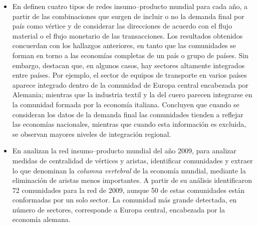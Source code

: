 \begin{itemize}
	\item En \textcite{Piccardi2018} definen cuatro tipos de redes insumo--producto mundial para cada año, a partir
    de las combinaciones que surgen de incluir o no la demanda final por país como vértice y de considerar las direcciones de acuerdo con el flujo material o el flujo monetario de las transacciones. Los resultados obtenidos concuerdan con los hallazgos anteriores, en tanto que las comunidades se forman en torno a las economías completas de un país o grupo de países. Sin embargo, destacan que, en algunos casos, hay sectores altamente integrados entre países. Por ejemplo, el sector de equipos de transporte en varios países aparece integrado dentro de la comunidad de Europa central encabezada por Alemania; mientras que la industria textil y la del cuero parecen integrarse en la comunidad formada por la economía italiana. Concluyen que cuando se consideran los datos de la demanda final las comunidades tienden a reflejar las economías nacionales, mientras que cuando esta información es excluida, se observan mayores niveles de integración regional.

	
	\item En \textcite{Xu2019} analizan la red insumo--producto mundial del año 2009, 
	para analizar medidas de centralidad de vértices y aristas, identificar comunidades y extraer lo que denominan la \textit{columna vertebral} de la economía mundial, mediante la eliminación de aristas menos importantes.
	A partir de su análisis identificaron 72 comunidades para la red de 2009, aunque 50 de estas comunidades están conformadas por un solo sector. La comunidad más grande detectada, en número de sectores, corresponde a Europa central, encabezada por la economía alemana.
	


\end{itemize}
